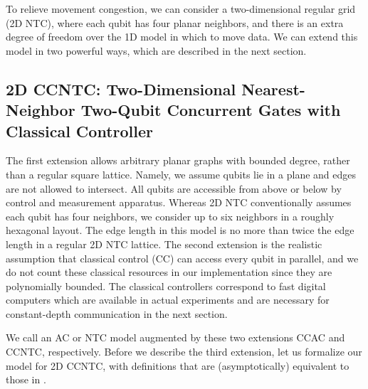 To relieve movement congestion,
we can consider a two-dimensional regular grid
(\textsf{2D NTC}), where each
qubit has four planar neighbors, and 
there is an extra degree of freedom over the 1D model
in which to move data.
We can extend this model in two powerful ways, which are described in the next section.

\subsection{\textsf{2D CCNTC}: Two-Dimensional Nearest-Neighbor Two-Qubit Concurrent Gates with Classical Controller}
\label{subsec:2dccntc}

The first extension allows arbitrary planar graphs
with bounded degree, rather than a regular square lattice.
Namely, we assume qubits lie in a plane and edges are not allowed to intersect.
All qubits are accessible from above
or below by control and measurement apparatus.
Whereas 2D NTC conventionally assumes each qubit
has four neighbors, we consider up to six neighbors in a roughly hexagonal
layout. The edge length in this model is no more than twice the edge length
in a regular 2D NTC lattice. The second extension is the realistic assumption
that classical control (CC) can
access every qubit in parallel, and we do not count these classical
resources in our implementation since they are polynomially bounded. The
classical controllers
correspond to fast digital computers which are
available in actual experiments and are necessary for constant-depth
communication in the next section.

We call an AC or NTC model augmented by these two extensions
\textsf{CCAC} and \textsf{CCNTC}, respectively. Before we describe the
third extension, let us formalize our model for \textsf{2D CCNTC}, with definitions that are (asymptotically) equivalent to those in 
\cite{Rosenbaum2012}.

